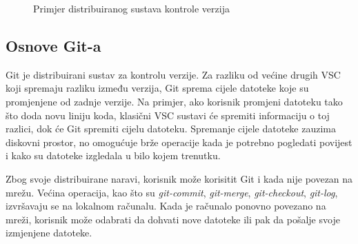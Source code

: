 \begin{figure}[h]

    \caption{Primjer distribuiranog sustava kontrole verzija}%
    \label{fig:02DVCS}
\end{figure}

\subsection{Osnove Git-a}
Git je distribuirani sustav za kontrolu verzije. Za razliku od većine drugih VSC koji spremaju
razliku između verzija, Git sprema cijele datoteke koje su promjenjene od zadnje verzije. Na
primjer, ako korisnik promjeni datoteku tako što doda novu liniju koda, klasični VSC sustavi će
spremiti informaciju o toj razlici, dok će Git spremiti cijelu datoteku. Spremanje cijele datoteke
zauzima diskovni prostor, no omogućuje brže operacije kada je potrebno pogledati povijest i kako su
datoteke izgledala u bilo kojem trenutku.

Zbog svoje distribuirane naravi, korisnik može korisitit Git i kada nije povezan na mrežu. Većina
operacija, kao što su \textit{git-commit}, \textit{git-merge}, \textit{git-checkout},
\textit{git-log}, izvršavaju se na lokalnom računalu. Kada je računalo ponovno povezano na mreži,
korisnik može odabrati da dohvati nove datoteke ili pak da pošalje svoje izmjenjene datoteke.

